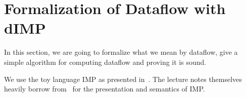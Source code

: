 \section{Formalization of Dataflow with dIMP}


In this section, we are going to formalize what we mean by dataflow,
give a simple algorithm for computing dataflow and proving it is sound.

We use the toy language IMP as presented in~\cite{sat}.
The lecture notes themselves heavily borrow from~\cite{fsopl} for the
presentation and semantics of IMP.

